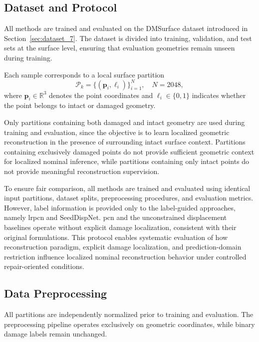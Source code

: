 \subsection{Dataset and Protocol}
\label{sec:dataset_protocol}

All methods are trained and evaluated on the DMSurface dataset introduced in Section~\ref{sec:dataset_7}. The dataset is divided into training, validation, and test sets at the surface level, ensuring that evaluation geometries remain unseen during training.

Each sample corresponds to a local surface partition
\begin{equation}
\mathcal{P}_{k} = \{(\mathbf{p}_i, \ell_i)\}_{i=1}^{N},
\quad
N = 2048,
\end{equation}
where $\mathbf{p}_i \in \mathbb{R}^3$ denotes the point coordinates and $\ell_i \in \{0,1\}$ indicates whether the point belongs to intact or damaged geometry.

Only partitions containing both damaged and intact geometry are used during training and evaluation, since the objective is to learn localized geometric reconstruction in the presence of surrounding intact surface context. Partitions containing exclusively damaged points do not provide sufficient geometric context for localized nominal inference, while partitions containing only intact points do not provide meaningful reconstruction supervision.

To ensure fair comparison, all methods are trained and evaluated using identical input partitions, dataset splits, preprocessing procedures, and evaluation metrics. However, label information is provided only to the label-guided approaches, namely \ac{lrpcn} and SeedDispNet. \ac{pcn} and the unconstrained displacement baselines operate without explicit damage localization, consistent with their original formulations. This protocol enables systematic evaluation of how reconstruction paradigm, explicit damage localization, and prediction-domain restriction influence localized nominal reconstruction behavior under controlled repair-oriented conditions.

\subsection{Data Preprocessing}
\label{sec:data_preprocessing}

All partitions are independently normalized prior to training and evaluation. The preprocessing pipeline operates exclusively on geometric coordinates, while binary damage labels remain unchanged.

